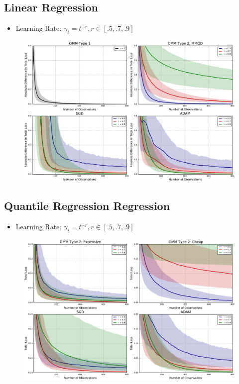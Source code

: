 \documentclass{beamer}
\begin{document}
\subsection{Linear Regression}
\begin{frame}
  \begin{itemize}
    \item Learning Rate: $\gamma_t = t^{-r}, r\in[.5, .7, .9]$
  \end{itemize}
  \begin{figure}
    \includegraphics[width=\textwidth]{figures/linregmm_simulation.pdf}
  \end{figure}
\end{frame}

\subsection{Quantile Regression Regression}
\begin{frame}
  \begin{itemize}
    \item Learning Rate: $\gamma_t = t^{-r}, r\in[.5, .7, .9]$
  \end{itemize}
  \begin{figure}
    \includegraphics[width=\textwidth]{figures/quantreg_simulation.pdf}
  \end{figure}
\end{frame}
\end{document}
